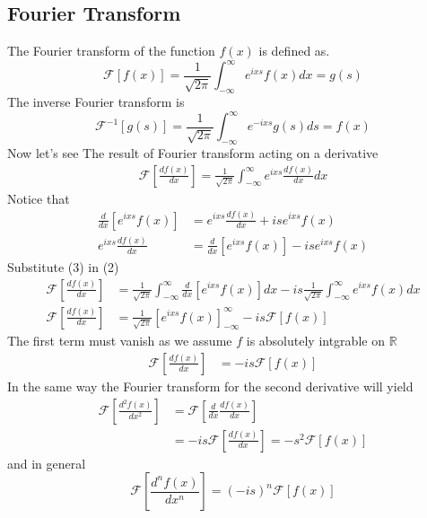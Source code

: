 \subsection{Fourier Transform}
The Fourier transform of the function $f(x)$ is defined as.
\[
    \mathscr{F}\left[f\left(x\right)\right]=\frac{1}{\sqrt{2\pi}}\int_{-\infty}^{\infty}e^{ixs}f\left(x\right)dx= g\left(s\right)    
\] 
The inverse Fourier transform is 
\[
    \mathscr{F}^{-1}\left[g\left(s\right)\right]=\frac{1}{\sqrt{2\pi}}\int_{-\infty}^{\infty}e^{-ixs}g\left(s\right)ds= f\left(x\right)    
\]
\setcounter{equation}{0}
Now let's see The result of Fourier transform acting on a derivative
\begin{align}
    \mathscr{F}\left[\frac{df\left(x\right)}{dx}\right]=\frac{1}{\sqrt{2\pi}}\int_{-\infty}^{\infty}e^{ixs}\frac{df\left(x\right)}{dx}dx
\end{align}
Notice that
\begin{align}
\frac{d}{dx}\left[e^{ixs}f\left(x\right)\right] &= e^{ixs}\frac{df\left(x\right)}{dx} + ise^{ixs}f\left(x\right)
\\
e^{ixs}\frac{df\left(x\right)}{dx} &= \frac{d}{dx}\left[e^{ixs}f\left(x\right)\right] -ise^{ixs}f\left(x\right)
\end{align}
Substitute (3) in (2)
\begin{align*}
\mathscr{F}\left[\frac{df\left(x\right)}{dx}\right] &= \frac{1}{\sqrt{2\pi}}
\int_{-\infty}^{\infty}\frac{d}{dx}\left[e^{ixs}f\left(x\right)\right]dx - is\frac{1}{\sqrt{2\pi}}\int_{-\infty}^{\infty}e^{ixs}f\left(x\right)dx
\\
\mathscr{F}\left[\frac{df\left(x\right)}{dx}\right] &= \frac{1}{\sqrt{2\pi}}{\left[e^{ixs}f\left(x\right)\right]}_{-\infty}^{\infty} - is \mathscr{F}\left[f\left(x\right)\right]
\end{align*}
The first term must vanish as we assume $f$ is absolutely intgrable on $\mathbb{R}$
\begin{align*}
\mathscr{F}\left[\frac{df\left(x\right)}{dx}\right] &= - is \mathscr{F}\left[f\left(x\right)\right]
\end{align*}
In the same way the Fourier transform for the second derivative will yield
\begin{align*}
\mathscr{F}\left[\frac{d^2f\left(x\right)}{dx^2}\right] &=  \mathscr{F}\left[\frac{d}{dx}\frac{df\left(x\right)}{dx}\right]
\\
&= - is\mathscr{F}\left[\frac{df\left(x\right)}{dx}\right] = -s^2 \mathscr{F}\left[f\left(x\right)\right]
\end{align*}
and in general
\[
    \mathscr{F}\left[\frac{d^nf\left(x\right)}{dx^n}\right] = {(-is)}^n\mathscr{F}\left[f\left(x\right)\right]    
\]
\setcounter{equation}{0}
